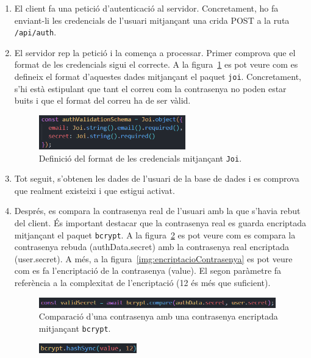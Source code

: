 \documentclass[a4paper,12pt]{ThesisStyle}
\begin{document}
\begin{enumerate}
  \item El client fa una petició d'autenticació al servidor. Concretament, ho fa enviant-li les credencials de l'usuari mitjançant una crida POST a la ruta \texttt{/api/auth}.
  \item El servidor rep la petició i la comença a processar. Primer comprova que el format de les credencials sigui el correcte. A la figura~\ref{img:credJoi} es pot veure com es defineix el format d'aquestes dades mitjançant el paquet \texttt{joi}. Concretament, s'hi està estipulant que tant el correu com la contrasenya no poden estar buits i que el format del correu ha de ser vàlid.
  \begin{figure}[H]
    \centering
    \includegraphics[width=0.6\textwidth]{assets/code/seguretat/esquemaJoiAuth.png}
    \caption{\label{img:credJoi}Definició del format de les credencials mitjançant \texttt{Joi}.}
  \end{figure}
  \item Tot seguit, s'obtenen les dades de l'usuari de la base de dades i es comprova que realment existeixi i que estigui activat.
  \item Després, es compara la contrasenya real de l'usuari amb la que s'havia rebut del client. És important destacar que la contrasenya real es guarda encriptada mitjançant el paquet \texttt{bcrypt}. A la figura~\ref{img:contrasenya} es pot veure com es compara la contrasenya rebuda (authData.secret) amb la contrasenya real encriptada (user.secret). A més, a la figura~\ref{img:encriptacioContrasenya} es pot veure com es fa l'encriptació de la contrasenya (value). El segon paràmetre fa referència a la complexitat de l'encriptació (12 és més que suficient).
  \begin{figure}[H]
    \centering
    \includegraphics[width=0.97\textwidth]{assets/code/seguretat/contrasenya.png}
    \caption{\label{img:contrasenya}Comparació d'una contrasenya amb una contrasenya encriptada mitjançant \texttt{bcrypt}.}
  \end{figure}
  \begin{figure}[H]
    \centering
    \includegraphics[width=0.4\textwidth]{assets/code/seguretat/encriptacioContrasenya.png}

\end{figure}
\end{enumerate}
\end{document}
